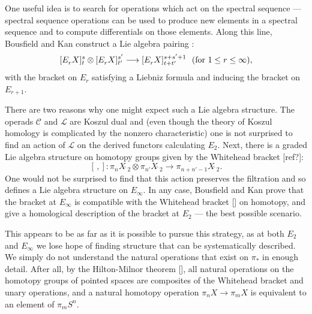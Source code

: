 \documentclass[11pt]{amsart} \renewcommand{\baselinestretch}{1.4}
\theoremstyle{plain}
\theoremstyle{definition}
\renewcommand{\to}{\longrightarrow}
\newcommand{\scrL}{\mathscr{L}}
\newcommand{\scrC}{\mathscr{C}}
\newcommand{\LieOperad}{{\scrL}}
\newcommand{\CommOperad}{{\scrC}}
\newcommand{\E}[5]{[E^{#1}_{#2}#3]^{#4}_{#5}}
\begin{document}
\begin{Introduction}
One useful idea is to search for operations which act on the spectral sequence --- spectral sequence operations can be used to produce new elements in a spectral sequence and to compute differentials on those elements. Along this line, Bousfield and Kan construct a Lie algebra pairing \cite[\S14]{BK_pairings_products.pdf}:
\[\E{}{r}{X}{s}{t} \otimes \E{}{r}{X}{s'}{t'}\to \E{}{r}{X}{s+s'+1}{t+t'}\textup{ \ (for $1\leq r\leq \infty$)},\]
with the bracket on $E_r$ satisfying  a Liebniz formula and inducing the bracket on $E_{r+1}$.

There are two reasons why one might expect such a Lie algebra structure. %
The operads $\CommOperad$ and $\LieOperad$ are Koszul dual and (even though the theory of Koszul homology is complicated by the nonzero characteristic) one is not surprised to find an action of $\LieOperad$ on the derived functors calculating $E_2$. %
Next, there is a graded Lie algebra structure on homotopy groups given by the Whitehead bracket [ref?]:
\[[\,,]:\pi_nX\hat{\ }_{\!\!\!2}\otimes \pi_{n'}X\hat{\ }_{\!\!\!2}\to \pi_{n+n'-1}X\hat{\ }_{\!\!\!2}.\]
One would not be surprised to find that  this action preserves the filtration and so defines a Lie algebra structure on $E_\infty$.
In any case, Bousfield and Kan prove that the bracket at $E_\infty$ is compatible with the Whitehead bracket [] on homotopy, and give a homological description  of the bracket at $E_2$ --- the best possible scenario.

This appears to be as far as it is possible to pursue this strategy, as at both $E_2$ and $E_\infty$ we lose hope of finding structure that can be systematically described. %
We simply do not understand the natural operations that exist on $\pi_*$ in enough detail. After all, by the Hilton-Milnor theorem [], all natural operations on the homotopy groups of pointed spaces are composites of the Whitehead bracket and unary operations, and a natural  homotopy operation $\pi_n X\to \pi_m X$ is equivalent to an element of $\pi_m S^n$.


\end{Introduction}
\end{document}
